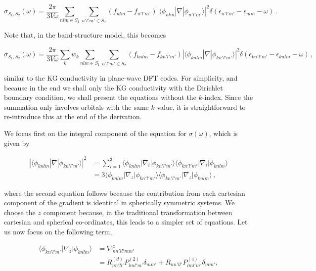 \documentclass[preprint,aps]{revtex4-2}
\begin{document}
\begin{equation}
\sigma_{S_1,S_2}(\omega) = \frac{2\pi}{3V\omega} \sum_{nlm\in S_1} \sum_{n'l'm'\in S_2} (f_{nlm} - f_{n'l'm'}) |\langle \phi_{nlm} | \nabla | \phi_{n'l'm'} \rangle|^2 \delta (\epsilon_{n'l'm'} - \epsilon_{nlm} - \omega)\,.
\end{equation}

Note that, in the band-structure model, this becomes

\begin{equation}
\sigma_{S_1,S_2} (\omega) = \frac{2\pi}{3V\omega} \sum_k w_k \sum_{nlm\in S_1} \sum_{n'l'm'\in S_2} (f_{knlm} - f_{kn'l'm'}) |\langle \phi_{knlm} | \nabla | \phi_{kn'l'm'} \rangle|^2 \delta (\epsilon_{kn'l'm'} - \epsilon_{knlm} - \omega)\,,
\end{equation}

similar to the KG conductivity in plane-wave DFT codes. For simplicity,
and because in the end we shall only the KG conductivity with the
Dirichlet boundary condition, we shall present the equations without the
\(k\)-index. Since the summation only involves orbitals with the same
\(k\)-value, it is straightforward to re-introduce this at the end of
the derivation.

We focus first on the integral component of the equation for
\(\sigma(\omega)\), which is given by

\begin{align}
|\langle \phi_{knlm} | \nabla | \phi_{kn'l'm'} \rangle|^2 &= \sum_{i=1}^3 \langle \phi_{knlm} | \nabla_i | \phi_{kn'l'm'} \rangle \langle \phi_{kn'l'm'} | \nabla_i | \phi_{knlm} \rangle \\
&=3 \langle \phi_{knlm} | \nabla_z | \phi_{kn'l'm'} \rangle \langle \phi_{kn'l'm'} | \nabla_z | \phi_{knlm} \rangle\,,
\end{align}

where the second equation follows because the contribution from each
cartesian component of the gradient is identical in spherically
symmetric systems. We choose the \(z\) component because, in the
traditional transformation between cartesian and spherical co-ordinates,
this leads to a simpler set of equations. Let us now focus on the
following term,

\begin{align}
\langle \phi_{kn'l'm'} | \nabla_z | \phi_{knlm} \rangle&= \nabla_{nn'll'mm'}^z \\
&=R^{(d)}_{nn'll'} P^{(2)}_{lml'm'} \delta_{mm'} + R_{nn'll'} P^{(4)}_{lml'm'} \delta_{mm'},
\end{align}
\end{document}
